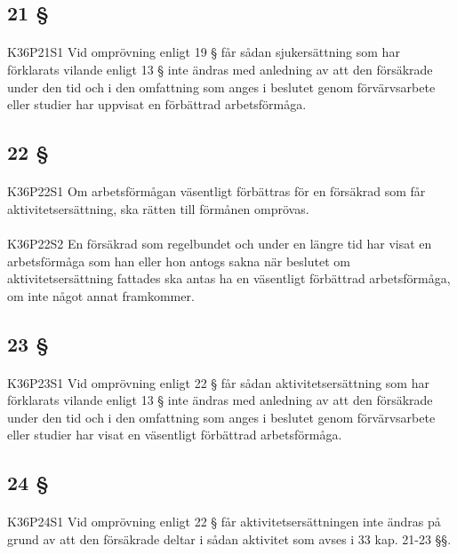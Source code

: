 \documentclass[a4paper,notitlepage,openany,10pt]{book}
\begin{document}
\subsection*{21 §}
\paragraph*{}
{\tiny K36P21S1}
Vid omprövning enligt 19 § får sådan sjukersättning som har förklarats vilande enligt 13 § inte ändras med anledning av att den försäkrade under den tid och i den omfattning som anges i beslutet genom förvärvsarbete eller studier har uppvisat en förbättrad arbetsförmåga.
\subsection*{22 §}
\paragraph*{}
{\tiny K36P22S1}
Om arbetsförmågan väsentligt förbättras för en försäkrad som får aktivitetsersättning, ska rätten till förmånen omprövas.
\paragraph*{}
{\tiny K36P22S2}
En försäkrad som regelbundet och under en längre tid har visat en arbetsförmåga som han eller hon antogs sakna när beslutet om aktivitetsersättning fattades ska antas ha en väsentligt förbättrad arbetsförmåga, om inte något annat framkommer.
\subsection*{23 §}
\paragraph*{}
{\tiny K36P23S1}
Vid omprövning enligt 22 § får sådan aktivitetsersättning som har förklarats vilande enligt 13 § inte ändras med anledning av att den försäkrade under den tid och i den omfattning som anges i beslutet genom förvärvsarbete eller studier har visat en väsentligt förbättrad arbetsförmåga.
\subsection*{24 §}
\paragraph*{}
{\tiny K36P24S1}
Vid omprövning enligt 22 § får aktivitetsersättningen inte ändras på grund av att den försäkrade deltar i sådan aktivitet som avses i 33 kap. 21-23 §§.
\end{document}
